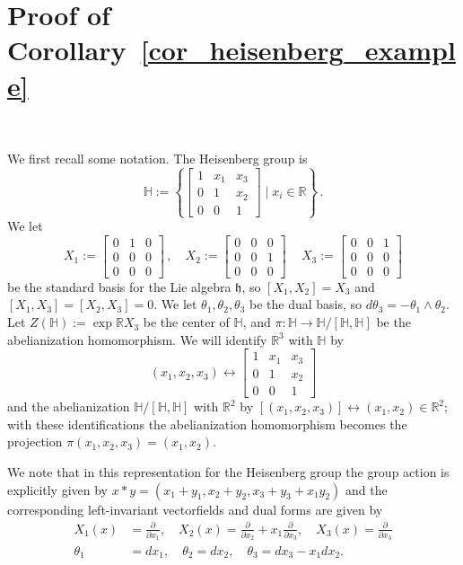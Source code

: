 \documentclass[titlepage]{amsart}
\numberwithin{equation}{section}
\theoremstyle{plain}
\theoremstyle{definition}
\theoremstyle{remark}
\newcommand{\fh}{\mathfrak{h}}
\renewcommand{\H}{\mathbb{H}}
\newcommand{\R}{\mathbb{R}}
\newcommand{\ra}{\rightarrow}
\renewcommand{\th}{\theta}
\newcommand{\we}{\wedge}
\begin{document}
\section{Proof of Corollary~\ref{cor_heisenberg_example}}~
\label{sec_proof_heisenberg_corollary}

We first recall some notation. The Heisenberg group is 
$$
\H:=\left\{\left[\begin{matrix}1&x_1&x_3\\0&1&x_2\\0&0&1\end{matrix}\right]\mid x_i\in\R\right\}\,.
$$
We let 
$$
X_1:=\left[\begin{matrix}0&1&0\\0&0&0\\0&0&0\end{matrix}\right]\,,\quad X_2:=\left[\begin{matrix}0&0&0\\0&0&1\\0&0&0\end{matrix}\right]\,\quad X_3:=\left[\begin{matrix}0&0&1\\0&0&0\\0&0&0\end{matrix}\right]
$$
be the standard basis for the Lie algebra $\fh$, so $[X_1,X_2]=X_3$ and $[X_1,X_3]=[X_2,X_3]=0$.  We let $\th_1,\th_2,\th_3$ be the dual basis, so $d\th_3=-\th_1\we\th_2$. 
Let $Z(\H):=\exp\R X_3$ be the center of $\H$, and $\pi:\H\ra \H/[\H,\H]$ be the abelianization homomorphism.  
We will identify $\R^3$ with $\H$ by 
$$
(x_1,x_2,x_3)\leftrightarrow \left[\begin{matrix}1&x_1&x_3\\0&1&x_2\\0&0&1\end{matrix}\right]
$$
and the abelianization $\H/[\H,\H]$ with $\R^2$ by $[(x_1,x_2,x_3)]\leftrightarrow (x_1,x_2)\in \R^2$; with these identifications the abelianization homomorphism becomes the projection $\pi(x_1,x_2,x_3)=(x_1,x_2)$.  

We note that in this representation for the Heisenberg group the group action is 
explicitly given by $x \ast y = (x_1+ y_1, x_2 + y_2, x_3 + y_3 + x_1 y_2)$ and the corresponding left-invariant vectorfields and dual forms are given by
\begin{align*}
X_1(x) &= \frac{\partial}{\partial x_1},  \quad  X_2(x) = \frac{\partial}{\partial x_2} + x_1  \frac{\partial}{\partial x_3}, \quad 
 X_3(x) = \frac{\partial}{\partial x_3} \\
\theta_1 &= dx_1, \quad \theta_2 = dx_2, \quad \theta_3 = dx_3 - x_1 dx_2.
\end{align*}
\end{document}
